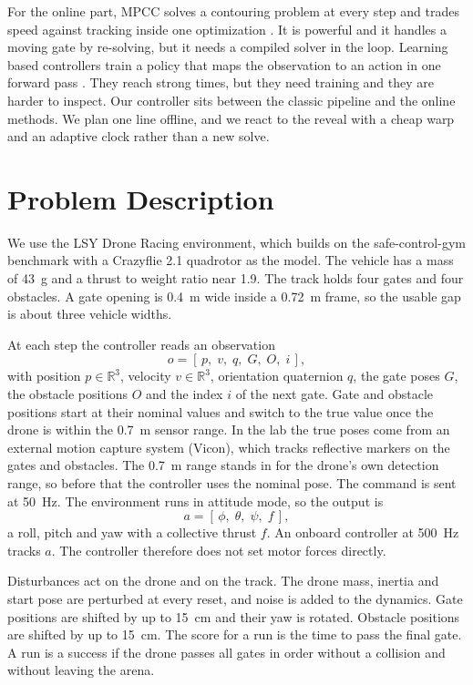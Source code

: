 \documentclass[conference]{IEEEtran}
\begin{document}
For the online part, MPCC solves a contouring problem at every step and trades speed against tracking inside one optimization \cite{mpcc}. It is powerful and it handles a moving gate by re-solving, but it needs a compiled solver in the loop. Learning based controllers train a policy that maps the observation to an action in one forward pass \cite{champion,songrl}. They reach strong times, but they need training and they are harder to inspect. Our controller sits between the classic pipeline and the online methods. We plan one line offline, and we react to the reveal with a cheap warp and an adaptive clock rather than a new solve.

\section{Problem Description}
\label{sec:problem}
We use the LSY Drone Racing environment, which builds on the safe-control-gym benchmark \cite{scg} with a Crazyflie 2.1 quadrotor \cite{crazyflie} as the model. The vehicle has a mass of 43~g and a thrust to weight ratio near 1.9. The track holds four gates and four obstacles. A gate opening is 0.4~m wide inside a 0.72~m frame, so the usable gap is about three vehicle widths.

At each step the controller reads an observation
\begin{equation}
o = [\, p,\; v,\; q,\; G,\; O,\; i \,],
\label{eq:obs}
\end{equation}
with position $p \in \mathbb{R}^3$, velocity $v \in \mathbb{R}^3$, orientation quaternion $q$, the gate poses $G$, the obstacle positions $O$ and the index $i$ of the next gate. Gate and obstacle positions start at their nominal values and switch to the true value once the drone is within the 0.7~m sensor range. In the lab the true poses come from an external motion capture system (Vicon), which tracks reflective markers on the gates and obstacles. The 0.7~m range stands in for the drone's own detection range, so before that the controller uses the nominal pose. The command is sent at 50~Hz. The environment runs in attitude mode, so the output is
\begin{equation}
a = [\, \phi,\; \theta,\; \psi,\; f \,],
\label{eq:act}
\end{equation}
a roll, pitch and yaw with a collective thrust $f$. An onboard controller at 500~Hz tracks $a$. The controller therefore does not set motor forces directly.

Disturbances act on the drone and on the track. The drone mass, inertia and start pose are perturbed at every reset, and noise is added to the dynamics. Gate positions are shifted by up to 15~cm and their yaw is rotated. Obstacle positions are shifted by up to 15~cm. The score for a run is the time to pass the final gate. A run is a success if the drone passes all gates in order without a collision and without leaving the arena.
\end{document}
